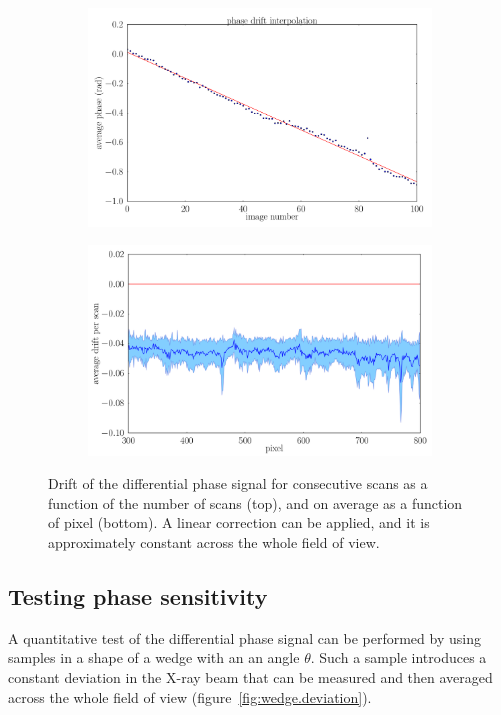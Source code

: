\begin{figure}[htb]
    \centering
    \begin{subfigure}[b]{.75\textwidth}
        \includegraphics[width=\textwidth]{gfx/mythen-edge-on/drift_fit.png}
        \caption{}
    \end{subfigure}
    \begin{subfigure}[b]{.75\textwidth}
        \includegraphics[width=\textwidth]{gfx/mythen-edge-on/drift_pixels.png}
        \caption{}
    \end{subfigure}
    \caption{Drift of the differential phase signal for consecutive scans as
    a function of the number of scans (top), and on average as a function
of pixel (bottom). A linear correction can be applied, and it is
approximately constant across the whole field of view.}
    \label{fig:phase.drift}
\end{figure}

\subsection{Testing phase sensitivity}
A quantitative test of the differential phase signal can be performed by
using samples in a shape of a wedge with an an angle $\theta$. Such a sample
introduces a constant deviation in the X-ray beam that can be measured and
then averaged across the whole field of view
(figure~\ref{fig:wedge.deviation}).

